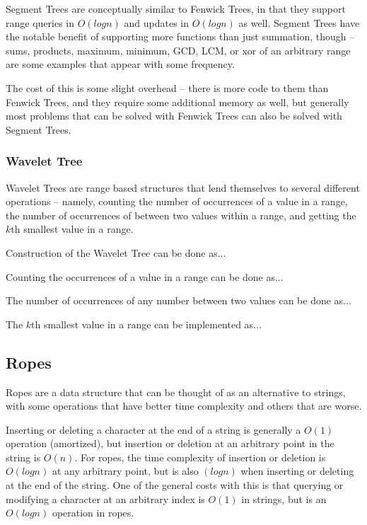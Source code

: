Segment Trees are conceptually similar to Fenwick Trees, in that they support range queries in $O(log n)$ and updates in $O(log n)$ as well. Segment Trees have the notable benefit of supporting more functions than just summation, though -- sums, products, maximum, minimum, GCD, LCM, or xor of an arbitrary range are some examples that appear with some frequency.

The cost of this is some slight overhead -- there is more code to them than Fenwick Trees, and they require some additional memory as well, but generally most problems that can be solved with Fenwick Trees can also be solved with Segment Trees.

\subsubsection{Wavelet Tree}

Wavelet Trees are range based structures that lend themselves to several different operations -- namely, counting the number of occurrences of a value in a range, the number of occurrences of between two values within a range, and getting the $k$th smallest value in a range.

Construction of the Wavelet Tree can be done as...

Counting the occurrences of a value in a range can be done as...

The number of occurrences of any number between two values can be done as...

The $k$th smallest value in a range can be implemented as...

\subsection{Ropes}

Ropes are a data structure that can be thought of as an alternative to strings, with some operations that have better time complexity and others that are worse.

Inserting or deleting a character at the end of a string is generally a $O(1)$ operation (amortized), but insertion or deletion at an arbitrary point in the string is $O(n)$. For ropes, the time complexity of insertion or deletion is $O(log n)$ at any arbitrary point, but is also $(log n)$ when inserting or deleting at the end of the string. One of the general costs with this is that querying or modifying a character at an arbitrary index is $O(1)$ in strings, but is an $O(log n)$ operation in ropes.

\hrulefill



\hrulefill
